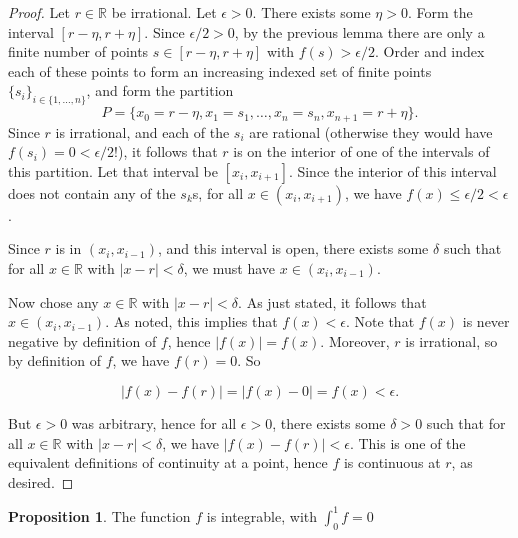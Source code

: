 \documentclass[12pt]{article}
\newcommand{\R}{\mathbb{R}}
\theoremstyle{definition}
\newtheorem{proposition}{Proposition}
\begin{document}
\begin{proof}
    Let $r\in \R$ be irrational. Let $\epsilon >0$. There exists some $\eta > 0$. Form the interval $[r - \eta, r + \eta]$. Since $\epsilon/2 > 0$, by the previous lemma there are only a finite number of points $s\in [ r - \eta, r + \eta]$ with $f(s) > \epsilon/2$. Order and index each of these points to form an increasing indexed set of finite points $\{s_i\}_{i\in \{1,\dots, n\}}$, and form the partition 
    \[
        P = \{x_0 = r - \eta, x_1 = s_1, \dots, x_n = s_n, x_{n+1} = r + \eta\}.
        \]
    Since $r$ is irrational, and each of the $s_i$ are rational (otherwise they would have $f(s_i) = 0 < \epsilon/2$!), it follows that $r$ is on the interior of one of the intervals of this partition. Let that interval be $ [x_i, x_{i+1}] $. Since the interior of this interval does not contain any of the $s_k$s, for all $x\in (x_i, x_{i +1})$, we have $f(x) \le  \epsilon/2 < \epsilon$.
    
    Since $r$ is in $(x_i, x_{i - 1})$, and this interval is open, there exists some $\delta$ such that for all $ x \in \R$ with $|x - r| < \delta$, we must have $ x\in (x_i, x_{i - 1}) $.

    Now chose any $x\in \R$ with $ |x - r| < \delta $. As just stated, it follows that $ x\in (x_i, x_{i - 1}) $. As noted, this implies that $ f(x) < \epsilon $. Note that $ f(x) $ is never negative by definition of $f$, hence $ |f(x)| = f(x) $. Moreover, $ r $ is irrational, so by definition of $f$, we have $ f(r) = 0 $. So 

    \[
        |f(x) - f(r)| = |f(x) - 0| = f(x) < \epsilon.
        \]

    But $\epsilon > 0$ was arbitrary, hence for all $\epsilon > 0$, there exists some $\delta > 0$ such that for all $ x\in \R $ with $ |x - r| < \delta $, we have $ |f(x) - f(r)| < \epsilon$. This is one of the equivalent definitions of continuity at a point, hence $f$ is continuous at $r$, as desired.
    
\end{proof}


\begin{proposition}
    The function $f$ is integrable, with $\int_0^1 f = 0$
\end{proposition}
\end{document}
